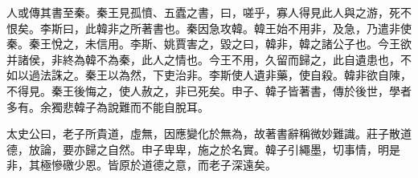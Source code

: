 人或傳其書至秦。秦王見孤憤、五蠹之書，曰，嗟乎，寡人得見此人與之游，死不恨矣。李斯曰，此韓非之所著書也。秦因急攻韓。韓王始不用非，及急，乃遣非使秦。秦王悅之，未信用。李斯、姚賈害之，毀之曰，韓非，韓之諸公子也。今王欲并諸侯，非終為韓不為秦，此人之情也。今王不用，久留而歸之，此自遺患也，不如以過法誅之。秦王以為然，下吏治非。李斯使人遺非藥，使自殺。韓非欲自陳，不得見。秦王後悔之，使人赦之，非已死矣。申子、韓子皆著書，傳於後世，學者多有。余獨悲韓子為說難而不能自脫耳。

太史公曰，老子所貴道，虛無，因應變化於無為，故著書辭稱微妙難識。莊子散道德，放論，要亦歸之自然。申子卑卑，施之於名實。韓子引繩墨，切事情，明是非，其極慘礉少恩。皆原於道德之意，而老子深遠矣。